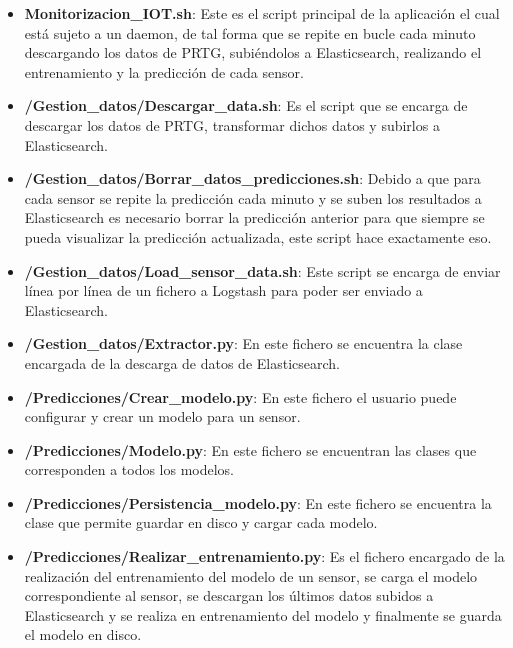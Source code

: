 \begin{itemize}
    \item \textbf{Monitorizacion\_IOT.sh}: Este es el script principal de la aplicación el cual está sujeto a un daemon, de tal forma que se repite en bucle cada minuto descargando los datos de PRTG, subiéndolos a Elasticsearch, realizando el entrenamiento y la predicción de cada sensor.
    
    \item \textbf{/Gestion\_datos/Descargar\_data.sh}: Es el script que se encarga de descargar los datos de PRTG, transformar dichos datos y subirlos a Elasticsearch.
    
    \item \textbf{/Gestion\_datos/Borrar\_datos\_predicciones.sh}: Debido a que para cada sensor se repite la predicción cada minuto y se suben los resultados a Elasticsearch es necesario borrar la predicción anterior para que siempre se pueda visualizar la predicción actualizada, este script hace exactamente eso.
    
    \item \textbf{/Gestion\_datos/Load\_sensor\_data.sh}: Este script se encarga de enviar línea por línea de un fichero a Logstash para poder ser enviado a Elasticsearch.
    
    \item \textbf{/Gestion\_datos/Extractor.py}: En este fichero se encuentra la clase encargada de la descarga de datos de Elasticsearch.
    
    \item \textbf{/Predicciones/Crear\_modelo.py}: En este fichero el usuario puede configurar y crear un modelo para un sensor.
    
    \item \textbf{/Predicciones/Modelo.py}: En este fichero se encuentran las clases que corresponden a todos los modelos.
    
    \item \textbf{/Predicciones/Persistencia\_modelo.py}: En este fichero se encuentra la clase que permite guardar en disco y cargar cada modelo.
    
    \item \textbf{/Predicciones/Realizar\_entrenamiento.py}: Es el fichero encargado de la realización del entrenamiento del modelo de un sensor, se carga el modelo correspondiente al sensor, se descargan los últimos datos subidos a Elasticsearch y se realiza en entrenamiento del modelo y finalmente se guarda el modelo en disco.
    

\end{itemize}
